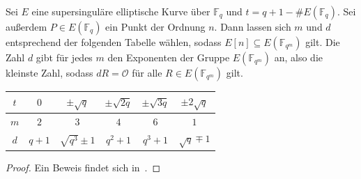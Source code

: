 \begin{proposition}
    Sei $E$ eine supersinguläre elliptische Kurve über $\mathbb{F}_q$ und $t=q+1-\#E(\mathbb{F}_q)$. Sei außerdem $P\in E(\mathbb{F}_q)$ ein Punkt der Ordnung $n$. Dann lassen sich $m$ und $d$ entsprechend der folgenden Tabelle wählen, sodass $E[n]\subseteq E(\mathbb{F}_{q^m})$ gilt. Die Zahl $d$ gibt für jedes $m$ den Exponenten der Gruppe $E(\mathbb{F}_{q^m})$ an, also die kleinste Zahl, sodass $dR=\mathcal{O}$ für alle $R\in E(\mathbb{F}_{q^m})$ gilt.
   \begin{table}[htbp]
    \centering
    \begin{tabular}{|c|c|c|c|c|c|}
        \hline
        $t$ & $0$ & $\pm\sqrt{q}$ & $\pm\sqrt{2q}$ 
            & $\pm\sqrt{3q}$ & $\pm 2\sqrt{q}$ \\
        \hline
        $m$ & $2$ & $3$ & $4$ & $6$ & $1$ \\
        \hline
        $d$ & $q+1$ & $\sqrt{q^3}\pm1$ & $q^2+1$ 
            & $q^3+1$ & $\sqrt{q}\mp 1$ \\
        \hline
    \end{tabular}
\end{table}
\end{proposition}
\begin{proof}
    Ein Beweis findet sich in~\cite[Table I, S.~85]{mov91}.
\end{proof}

